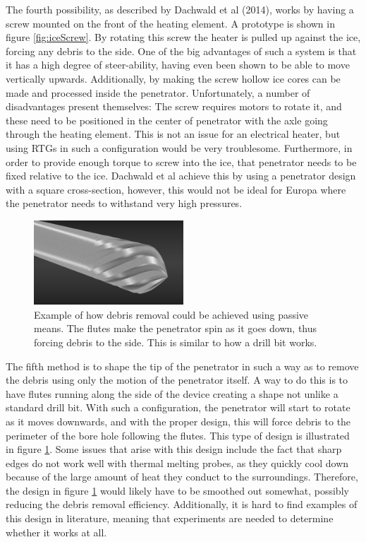 \noindent
The fourth possibility, as described by Dachwald et al (2014)\cite{article:dachwald2014a}, works by having a screw mounted on the front of the heating element. A prototype is shown in figure \ref{fig:iceScrew}. By rotating this screw the heater is pulled up against the ice, forcing any debris to the side. One of the big advantages of such a system is that it has a high degree of steer-ability, having even been shown to be able to move vertically upwards\cite{article:dachwald2014a}.  
Additionally, by making the screw hollow ice cores can be made and processed inside the penetrator. Unfortunately, a number of disadvantages present themselves: The screw requires motors to rotate it, and these need to be positioned in the center of penetrator with the axle going through the heating element. This is not an issue for an electrical heater, but using RTGs in such a configuration would be very troublesome. Furthermore, in order to provide enough torque to screw into the ice, that penetrator needs to be fixed relative to the ice. Dachwald et al achieve this by using a penetrator design with a square cross-section, however, this would not be ideal for Europa where the penetrator needs to withstand very high pressures.\\

 \begin{figure}[ht]
 	\centering
 	\includegraphics[width=0.5\textwidth]{figures/LAMC/flutedHead}
 	\caption{Example of how debris removal could be achieved using passive means. The flutes make the penetrator spin as it goes down, thus forcing debris to the side. This is similar to how a drill bit works.}
 	\label{fig:flutedHead}
 \end{figure}  

\noindent
The fifth method is to shape the tip of the penetrator in such a way as to remove the debris using only the motion of the penetrator itself. A way to do this is to have flutes running along the side of the device creating a shape not unlike a standard drill bit. With such a configuration, the penetrator will start to rotate as it moves downwards, and with the proper design, this will force debris to the perimeter of the bore hole following the flutes. This type of design is illustrated in figure \ref{fig:flutedHead}.  
Some issues that arise with this design include the fact that sharp edges do not work well with thermal melting probes, as they quickly cool down because of the large amount of heat they conduct to the surroundings. Therefore, the design in figure \ref{fig:flutedHead} would likely have to be smoothed out somewhat, possibly reducing the debris removal efficiency. Additionally, it is hard to find examples of this design in literature, meaning that experiments are needed to determine whether it works at all. \\

